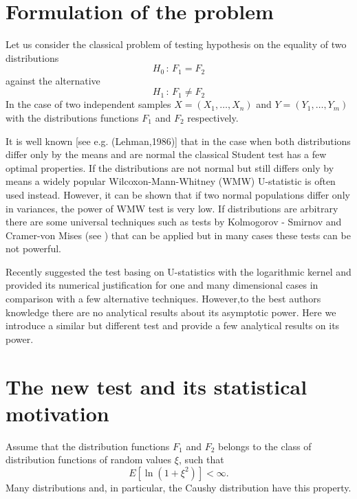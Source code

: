 \documentclass[final,11pt,3p]{elsarticle}
\begin{document}
\section{Formulation of the problem}
\label{S:1}
Let us consider the classical problem of testing hypothesis on the equality of two distributions
\begin{equation}
  \label{H0}
  H_0\,:\,F_1 = F_2
\end{equation}
against the alternative
\begin{equation}
  \label{H1}
  H_1\,:\,F_1 \not= F_2
\end{equation}
In the case of two independent samples $X=(X_{1},\ldots, X_{n})$ and $Y=(Y_{1},\ldots, Y_{m})$ with the distributions functions $F_1$ and $F_2$ respectively.


It is well known [see e.g. (Lehman,1986)] that in the case when both distributions differ only by the means and are normal the classical Student test has a few optimal properties. If the distributions are not normal but still differs only by means a widely popular Wilcoxon-Mann-Whitney (WMW) U-statistic is often used instead. However, it can be shown that if two normal populations differ only in variances, the power of WMW test is very low.
If distributions are arbitrary there are some universal techniques such as tests by Kolmogorov - Smirnov and Cramer-von Mises  (see \cite{Buening2001}) that can be applied but in many cases these tests can be not powerful.

 Recently \cite{AslanZech2005} suggested the test basing on U-statistics with the
logarithmic kernel and provided its numerical justification for one and many dimensional cases in comparison with a few alternative techniques.  However,to the best authors knowledge there are no analytical results about its asymptotic power. Here we introduce a similar but different test and provide a few analytical results on its power.



\section{The new test and its statistical motivation}

Assume that the distribution functions
$F_1$ and $F_2$ belongs to the class of distribution functions of random values  $\xi$, such that
\begin {equation}\label{Class}
E [\ln (1+ \xi^2)     ] < \infty.
\end{equation}
Many distributions and, in particular, the Caushy distribution have this property.
 \bigskip
\end{document}
